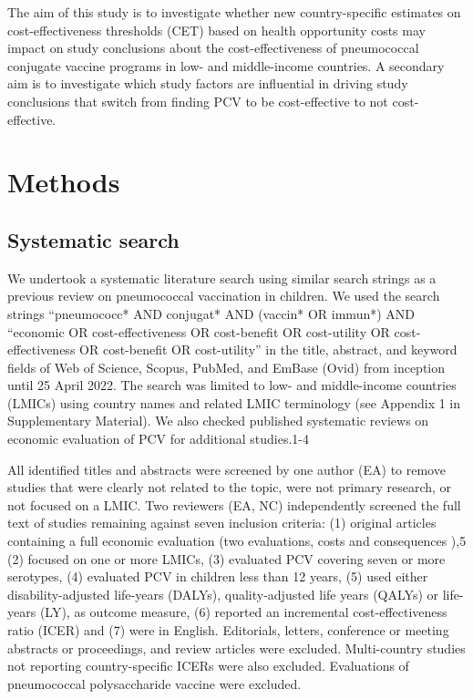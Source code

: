 \documentclass[12pt]{article}
\begin{document}
The aim of this study is to investigate whether new country-specific estimates on cost-effectiveness thresholds (CET) based on health opportunity costs may impact on study conclusions about the cost-effectiveness of pneumococcal conjugate vaccine programs in low- and middle-income countries. A secondary aim is to investigate which study factors are influential in driving study conclusions that switch from finding PCV to be cost-effective to not cost-effective.


\section*{Methods}
\subsection*{Systematic search}
We undertook a systematic literature search using similar search strings as a previous review on pneumococcal vaccination in children.\supercite{saokaew_cost_2016} We used the search strings “pneumococc* AND conjugat* AND (vaccin* OR immun*) AND “economic OR cost-effectiveness OR cost-benefit OR cost-utility OR cost-effectiveness OR cost-benefit OR cost-utility” in the title, abstract, and keyword fields of Web of Science, Scopus, PubMed, and EmBase (Ovid) from inception until 25 April 2022. The search was limited to low- and middle-income countries (LMICs) using country names and related LMIC terminology (see Appendix 1 in Supplementary Material). We also checked published systematic reviews on economic evaluation of PCV for additional studies.1-4

All identified titles and abstracts were screened by one author (EA) to remove studies that were clearly not related to the topic, were not primary research, or not focused on a LMIC. Two reviewers (EA, NC) independently screened the full text of studies remaining against seven inclusion criteria: (1) original articles containing a full economic evaluation (two evaluations, costs and consequences ),5 (2) focused on one or more LMICs, (3) evaluated PCV covering seven or more serotypes, (4) evaluated PCV in children less than 12 years, (5) used either disability-adjusted life-years (DALYs), quality-adjusted life years (QALYs) or life-years (LY), as outcome measure, (6) reported an incremental cost-effectiveness ratio (ICER) and (7) were in English. Editorials, letters, conference or meeting abstracts or proceedings, and review articles were excluded. Multi-country studies not reporting country-specific ICERs were also excluded. Evaluations of pneumococcal polysaccharide vaccine were excluded.
\end{document}
